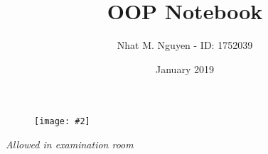 \documentclass[9pt, landscape, a4paper]{article}
\title{\vspace{-4ex}\Large{OOP Notebook}}
\author{Nhat M. Nguyen - ID: 1752039}
\date{January 2019}
\newcommand{\ti}[1]{\textit{#1}}
\newcommand{\img}[2][]
  {
    \begin{figure}[H]
      \centering
      \texttt{[image: \#2]}
    \end{figure}
  }
\begin{document}
  \maketitle
  \img[width=3cm]{logo.jpeg}
  \setcounter{tocdepth}{2}
  \begin{multicols}{2}
    \tableofcontents
  \end{multicols}
  \begin{center}
  \ti{Allowed in examination room}
  \end{center}
\clearpage
\begin{multicols}{2}

\end{multicols}
\end{document}
